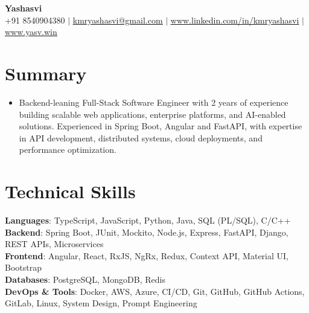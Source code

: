 \documentclass[letterpaper,11pt]{article}
\newcommand{\resumeItem}[1]{\item\small{{#1 \vspace{-2pt}}}}
\newcommand{\resumeSubHeadingListStart}{\begin{itemize}[leftmargin=0.0in, label={}]}
\newcommand{\resumeSubHeadingListEnd}{\end{itemize}}
\begin{document}
\begin{center}
    {\Huge\bfseries Yashasvi} \\ \vspace{4pt}
    \small
    +91 8540904380
    \hspace{0.2em}
    $|$
    \hspace{0.2em}
    \href{mailto:kmryashasvi@gmail.com}{\underline{kmryashasvi@gmail.com}}
    \hspace{0.2em}
    $|$
    \hspace{0.2em}
    \href{https://www.linkedin.com/in/kmryashasvi}{\underline{www.linkedin.com/in/kmryashasvi}}
    \hspace{0.2em}
    $|$
    \hspace{0.2em}
    \href{https://www.yasv.win}{\underline{www.yasv.win}}
\end{center}

\section{Summary}
\resumeSubHeadingListStart
\resumeItem{Backend-leaning Full-Stack Software Engineer with 2 years of experience building scalable web applications, enterprise platforms, and AI-enabled solutions. Experienced in Spring Boot, Angular and FastAPI, with expertise in API development, distributed systems, cloud deployments, and performance optimization.}
\resumeSubHeadingListEnd
\vspace{-15pt}

\section{Technical Skills}
\begin{itemize}[leftmargin=0.0in, label={}, itemsep=0pt, topsep=2pt]
\small{\item{
\textbf{Languages}{: TypeScript, JavaScript, Python, Java, SQL (PL/SQL), C/C++} \\
\textbf{Backend}{: Spring Boot, JUnit, Mockito, Node.js, Express, FastAPI, Django, REST APIs, Microservices} \\
\textbf{Frontend}{: Angular, React, RxJS, NgRx, Redux, Context API, Material UI, Bootstrap} \\
\textbf{Databases}{: PostgreSQL, MongoDB, Redis} \\
\textbf{DevOps \& Tools}{: Docker, AWS, Azure, CI/CD, Git, GitHub, GitHub Actions, GitLab, Linux, System Design, Prompt Engineering}
}}
\end{itemize}
\vspace{-11pt}
\end{document}
